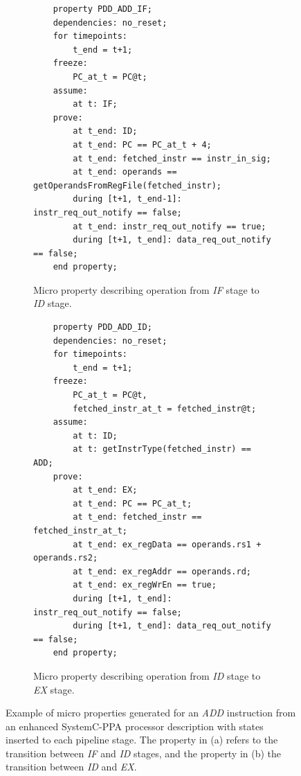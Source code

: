 \begin{figure}[htb!]
     \centering
     \begin{subfigure}[b]{\textwidth}
         \begin{lstlisting}
    property PDD_ADD_IF;
    dependencies: no_reset;
    for timepoints:
        t_end = t+1;
    freeze:
        PC_at_t = PC@t;
    assume:
        at t: IF;
    prove:
        at t_end: ID;
        at t_end: PC == PC_at_t + 4;
        at t_end: fetched_instr == instr_in_sig;
        at t_end: operands == getOperandsFromRegFile(fetched_instr);
        during [t+1, t_end-1]: instr_req_out_notify == false;
        at t_end: instr_req_out_notify == true;
        during [t+1, t_end]: data_req_out_notify == false;
    end property;\end{lstlisting}
         \caption{Micro property describing operation from \textit{IF} stage to \textit{ID} stage.}
         \label{subfig:ex-two-micro-ppt-if}
     \end{subfigure}
     \hfill
     \begin{subfigure}[b]{\textwidth}
         \begin{lstlisting}
    property PDD_ADD_ID;
    dependencies: no_reset;
    for timepoints:
        t_end = t+1;
    freeze:
        PC_at_t = PC@t,
        fetched_instr_at_t = fetched_instr@t;
    assume:
        at t: ID;
        at t: getInstrType(fetched_instr) == ADD;
    prove:
        at t_end: EX;
        at t_end: PC == PC_at_t;
        at t_end: fetched_instr == fetched_instr_at_t;
        at t_end: ex_regData == operands.rs1 + operands.rs2;
        at t_end: ex_regAddr == operands.rd;
        at t_end: ex_regWrEn == true;
        during [t+1, t_end]: instr_req_out_notify == false;
        during [t+1, t_end]: data_req_out_notify == false;
    end property;\end{lstlisting}
         \caption{Micro property describing operation from \textit{ID} stage to \textit{EX} stage.}
         \label{subfig:ex-two-micro-ppt-id}
     \end{subfigure}
        \caption{Example of micro properties generated for an \textit{ADD} instruction from an enhanced SystemC-PPA processor description with states inserted to each pipeline stage. The property in (a) refers to the transition between \textit{IF} and \textit{ID} stages, and the property in (b) the transition between \textit{ID} and \textit{EX}.}
        \label{fig:ex-two-micro-ppt}
\end{figure}

